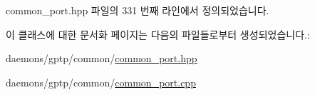 common\+\_\+port.\+hpp 파일의 331 번째 라인에서 정의되었습니다.



이 클래스에 대한 문서화 페이지는 다음의 파일들로부터 생성되었습니다.\+:\begin{DoxyCompactItemize}
\item 
daemons/gptp/common/\hyperlink{common__port_8hpp}{common\+\_\+port.\+hpp}\item 
daemons/gptp/common/\hyperlink{common__port_8cpp}{common\+\_\+port.\+cpp}\end{DoxyCompactItemize}
